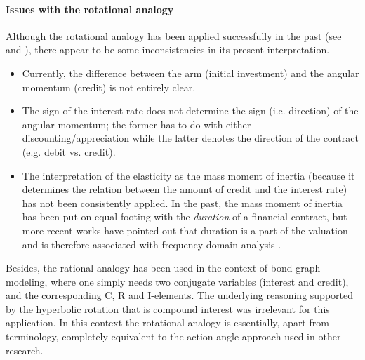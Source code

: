 \paragraph{Issues with the rotational analogy} Although the rotational analogy has been applied successfully in the past (see \citet{Kruimer2021} and \citet{VanArdenne2020}), there appear to be some inconsistencies in its present interpretation. 
\begin{itemize}
    \item Currently, the difference between the arm (initial investment) and the angular momentum (credit) is not entirely clear.
    \item The sign of the interest rate does not determine the sign (i.e. direction) of the angular momentum; the former has to do with either discounting/appreciation while the latter denotes the direction of the contract (e.g. debit vs. credit).
    \item The interpretation of the elasticity as the mass moment of inertia (because it determines the relation between the amount of credit and the interest rate) has not been consistently applied. In the past, the mass moment of inertia has been put on equal footing with the \emph{duration} of a financial contract, but more recent works have pointed out that duration is a part of the valuation and is therefore associated with frequency domain analysis \cite{Krabbenborg2021}.
\end{itemize}
Besides, the rational analogy has been used in the context of bond graph modeling, where one simply needs two conjugate variables (interest and credit), and the corresponding C, R and I-elements. The underlying reasoning supported by the hyperbolic rotation that is compound interest was irrelevant for this application. In this context the rotational analogy is essentially, apart from terminology, completely equivalent to the action-angle approach used in other research.

